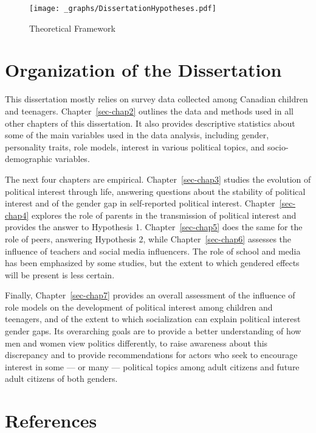 \documentclass[
  letterpaper,
  DIV=11,
  numbers=noendperiod]{scrreprt}
\begin{document}
\begin{figure}

{\centering \texttt{[image: \_graphs/DissertationHypotheses.pdf]}

}

\caption{\label{fig-hypotheses}Theoretical Framework}

\end{figure}

\hypertarget{organization-of-the-dissertation}{%
\section{Organization of the
Dissertation}\label{organization-of-the-dissertation}}

This dissertation mostly relies on survey data collected among Canadian
children and teenagers. Chapter~\ref{sec-chap2} outlines the data and
methods used in all other chapters of this dissertation. It also
provides descriptive statistics about some of the main variables used in
the data analysis, including gender, personality traits, role models,
interest in various political topics, and socio-demographic variables.

The next four chapters are empirical. Chapter~\ref{sec-chap3} studies
the evolution of political interest through life, answering questions
about the stability of political interest and of the gender gap in
self-reported political interest. Chapter~\ref{sec-chap4} explores the
role of parents in the transmission of political interest and provides
the answer to Hypothesis 1. Chapter~\ref{sec-chap5} does the same for
the role of peers, answering Hypothesis 2, while Chapter~\ref{sec-chap6}
assesses the influence of teachers and social media influencers. The
role of school and media has been emphasized by some studies, but the
extent to which gendered effects will be present is less certain.

Finally, Chapter~\ref{sec-chap7} provides an overall assessment of the
influence of role models on the development of political interest among
children and teenagers, and of the extent to which socialization can
explain political interest gender gaps. Its overarching goals are to
provide a better understanding of how men and women view politics
differently, to raise awareness about this discrepancy and to provide
recommendations for actors who seek to encourage interest in some --- or
many --- political topics among adult citizens and future adult citizens
of both genders.

\hypertarget{references}{%
\section{References}\label{references}}
\end{document}
